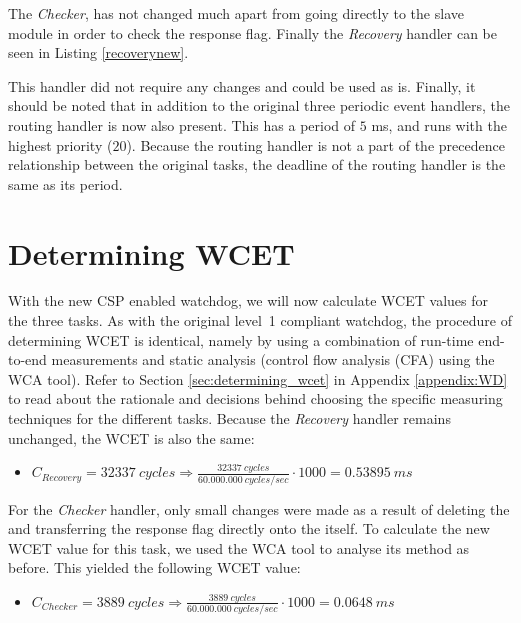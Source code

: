

The \textit{Checker}, has not changed much apart from going directly to the slave module in order to check the response flag. Finally the \textit{Recovery} handler can be seen in Listing \ref{recoverynew}.



This handler did not require any changes and could be used as is. Finally, it should be noted that in addition to the original three periodic event handlers, the routing handler is now also present. This has a period of $5$ ms, and runs with the highest priority ($20$). Because the routing handler is not a part of the precedence relationship between the original tasks, the deadline of the routing handler is the same as its period.

\section{Determining WCET}
With the new CSP enabled watchdog, we will now calculate WCET values for the three tasks. As with the original level~1 compliant watchdog, the procedure of determining WCET is identical, namely by using a combination of run-time end-to-end measurements and static analysis (control flow analysis (CFA) using the WCA tool). Refer to Section \ref{sec:determining_wcet} in Appendix \ref{appendix:WD} to read about the rationale and decisions behind choosing the specific measuring techniques for the different tasks. Because the \textit{Recovery} handler remains unchanged, the WCET is also the same:

\begin{itemize}
	\item $C_{Recovery} = 32337\ cycles \Rightarrow \frac{32337\ cycles}{60.000.000\ cycles/sec} \cdot 1000 = 0.53895\ ms$
\end{itemize}

For the \textit{Checker} handler, only small changes were made as a result of deleting the  and transferring the response flag directly onto the  itself. To calculate the new WCET value for this task, we used the WCA tool to analyse its  method as before. This yielded the following WCET value:

\begin{itemize}
	\item $C_{Checker} = 3889\ cycles \Rightarrow \frac{3889\ cycles}{60.000.000\ cycles/sec} \cdot 1000 = 0.0648\ ms$
\end{itemize}


